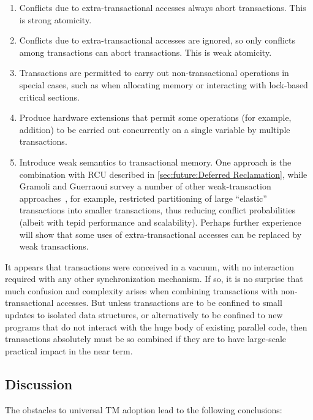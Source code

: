 \begin{enumerate}
\item	Conflicts due to extra-transactional accesses always abort
	transactions.
	This is strong atomicity.
\item	Conflicts due to extra-transactional accesses are ignored,
	so only conflicts among transactions can abort transactions.
	This is weak atomicity.
\item	Transactions are permitted to carry out non-transactional
	operations in special cases, such as when allocating memory or
	interacting with lock-based critical sections.
\item	Produce hardware extensions that permit some operations
	(for example, addition) to be carried out concurrently on a
	single variable by multiple transactions.
\item	Introduce weak semantics to transactional memory.
	One approach is the combination with RCU described in
	\cref{sec:future:Deferred Reclamation},
	while Gramoli and Guerraoui
	survey a number of other weak-transaction
	approaches~\cite{Gramoli:2014:DTP:2541883.2541900}, for example,
	restricted partitioning of large
	``elastic'' transactions into smaller transactions, thus
	reducing conflict probabilities (albeit with tepid performance
	and scalability).
	Perhaps further experience will show that some uses of
	extra-transactional accesses can be replaced by weak
	transactions.
\end{enumerate}

It appears that transactions were conceived in a vacuum, with no
interaction required with any other synchronization mechanism.
If so, it is no surprise that much confusion and complexity arises when
combining transactions with non-transactional accesses.
But unless transactions are to be confined to small updates to isolated
data structures, or alternatively to be confined to new programs
that do not interact with the huge body of existing parallel code,
then transactions absolutely must be so combined if they are to have
large-scale practical impact in the near term.


\subsection{Discussion}
\label{sec:future:Discussion}

The obstacles to universal TM adoption lead to the following
conclusions:

